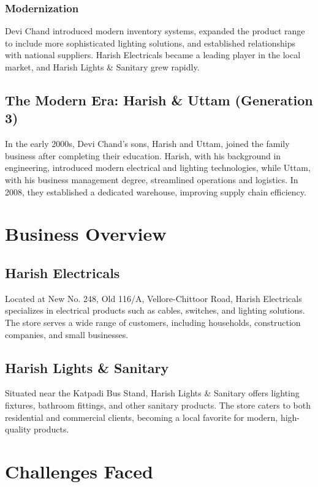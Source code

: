 \documentclass[a4paper,12pt]{report}
\begin{document}
\subsection{Modernization}
Devi Chand introduced modern inventory systems, expanded the product range to include more sophisticated lighting solutions, and established relationships with national suppliers. Harish Electricals became a leading player in the local market, and Harish Lights \& Sanitary grew rapidly.

\section{The Modern Era: Harish \& Uttam (Generation 3)}
In the early 2000s, Devi Chand's sons, Harish and Uttam, joined the family business after completing their education. Harish, with his background in engineering, introduced modern electrical and lighting technologies, while Uttam, with his business management degree, streamlined operations and logistics. In 2008, they established a dedicated warehouse, improving supply chain efficiency.

\chapter{Business Overview}

\section{Harish Electricals}
Located at New No. 248, Old 116/A, Vellore-Chittoor Road, Harish Electricals specializes in electrical products such as cables, switches, and lighting solutions. The store serves a wide range of customers, including households, construction companies, and small businesses.

\section{Harish Lights \& Sanitary}
Situated near the Katpadi Bus Stand, Harish Lights \& Sanitary offers lighting fixtures, bathroom fittings, and other sanitary products. The store caters to both residential and commercial clients, becoming a local favorite for modern, high-quality products.



\chapter{Challenges Faced}
\end{document}

